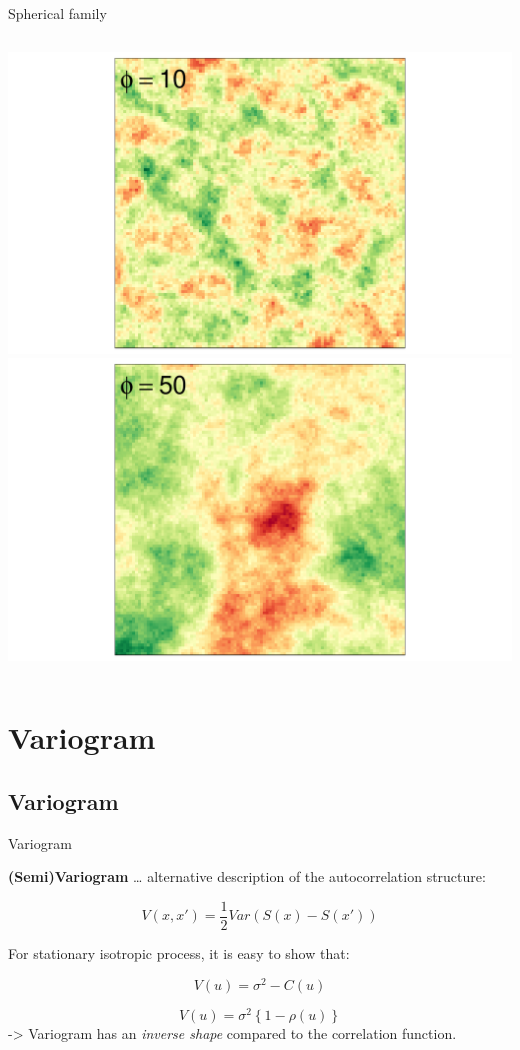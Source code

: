\documentclass[
  ignorenonframetext,
]{beamer}
\begin{document}
\begin{frame}{Spherical family}
\begin{columns}[T]
\begin{column}{0.5\textwidth}
\includegraphics{Lecture_1_files/figure-beamer/unnamed-chunk-46-1.pdf}
\includegraphics{Lecture_1_files/figure-beamer/unnamed-chunk-47-1.pdf}
\end{column}
\end{columns}
\end{frame}

\hypertarget{variogram}{%
\section{Variogram}\label{variogram}}

\hypertarget{variogram-1}{%
\subsection{Variogram}\label{variogram-1}}

\begin{frame}{Variogram}
\small

\textbf{(Semi)Variogram} \ldots{} alternative description of the
autocorrelation structure:

\[V(x,x')=\frac{1}{2}Var\left(S(x)-S(x')\right)\]

For stationary isotropic process, it is easy to show that:

\[V(u) = \sigma^2 - C(u)\]

\[V(u)=\sigma^2\left\{1-\rho(u)\right\}\] -\textgreater{} Variogram has
an \emph{inverse shape} compared to the correlation function.
\end{frame}
\end{document}
